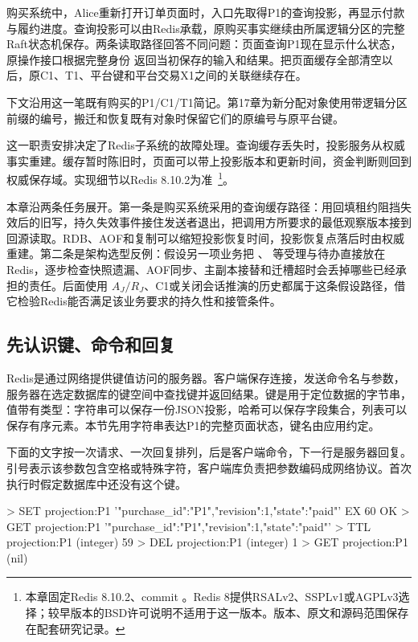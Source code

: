 购买系统中，Alice重新打开订单页面时，入口先取得P1的查询投影，再显示付款与履约进度。查询投影可以由Redis承载，原购买事实继续由所属逻辑分区的完整Raft状态机保存。两条读取路径回答不同问题：页面查询P1现在显示什么状态，原操作接口根据完整身份
返回当初保存的输入和结果。把页面缓存全部清空以后，原C1、T1、平台键和平台交易X1之间的关联继续存在。

下文沿用这一笔既有购买的P1/C1/T1简记。第17章为新分配对象使用带逻辑分区前缀的编号，搬迁和恢复既有对象时保留它们的原编号与原平台键。

这一职责安排决定了Redis子系统的故障处理。查询缓存丢失时，投影服务从权威事实重建。缓存暂时陈旧时，页面可以带上投影版本和更新时间，资金判断则回到权威保存域。实现细节以Redis 8.10.2为准~\cite{redis8102-source}\footnote{本章固定Redis 8.10.2、commit 。Redis 8提供RSALv2、SSPLv1或AGPLv3选择；较早版本的BSD许可说明不适用于这一版本。版本、原文和源码范围保存在配套研究记录。}。

本章沿两条任务展开。第一条是购买系统采用的查询缓存路径：用回填租约阻挡失效后的旧写，持久失效事件接住发送者退出，把调用方所要求的最低观察版本接到回源读取。RDB、AOF和复制可以缩短投影恢复时间，投影恢复点落后时由权威重建。第二条是架构选型反例：假设另一项业务把 、 等受理与待办直接放在Redis，逐步检查快照遗漏、AOF同步、主副本接替和迁槽超时会丢掉哪些已经承担的责任。后面使用 $A_J/R_J$、C1或关闭会话推演的历史都属于这条假设路径，借它检验Redis能否满足该业务要求的持久性和接管条件。


\subsection{先认识键、命令和回复}

Redis是通过网络提供键值访问的服务器。客户端保存连接，发送命令名与参数，服务器在选定数据库的键空间中查找键并返回结果。键是用于定位数据的字节串，值带有类型：字符串可以保存一份JSON投影，哈希可以保存字段集合，列表可以保存有序元素。本节先用字符串表达P1的完整页面状态，键名由应用约定。

下面的文字按一次请求、一次回复排列，\code{>}后是客户端命令，下一行是服务器回复。引号表示该参数包含空格或特殊字符，客户端库负责把参数编码成网络协议。首次执行时假定数据库中还没有这个键。

\begin{BookCode}
> SET projection:P1 '{"purchase_id":"P1","revision":1,"state":"paid"}' EX 60
OK
> GET projection:P1
'{"purchase_id":"P1","revision":1,"state":"paid"}'
> TTL projection:P1
(integer) 59
> DEL projection:P1
(integer) 1
> GET projection:P1
(nil)
\end{BookCode}

